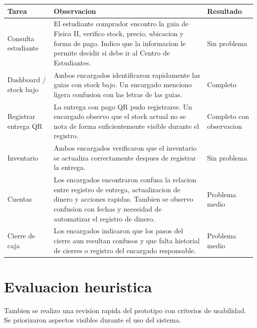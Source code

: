 \documentclass[12pt,letterpaper]{article}
\begin{document}
\begin{center}
\begin{tabularx}{\textwidth}{|B{3.6cm}|Y|B{2.6cm}|}
\hline
Tarea & Observacion & Resultado \\
\hline
Consulta estudiante & El estudiante comprador encontro la guia de Fisica II, verifico stock, precio, ubicacion y forma de pago. Indico que la informacion le permite decidir si debe ir al Centro de Estudiantes. & Sin problema \\
\hline
Dashboard / stock bajo & Ambos encargados identificaron rapidamente las guias con stock bajo. Un encargado menciono ligera confusion con las letras de las guias. & Completo \\
\hline
Registrar entrega QR & La entrega con pago QR pudo registrarse. Un encargado observo que el stock actual no se nota de forma suficientemente visible durante el registro. & Completo con observacion \\
\hline
Inventario & Ambos encargados verificaron que el inventario se actualiza correctamente despues de registrar la entrega. & Sin problema \\
\hline
Cuentas & Los encargados encontraron confusa la relacion entre registro de entrega, actualizacion de dinero y acciones rapidas. Tambien se observo confusion con fechas y necesidad de automatizar el registro de dinero. & Problema medio \\
\hline
Cierre de caja & Los encargados indicaron que los pasos del cierre aun resultan confusos y que falta historial de cierres o registro del encargado responsable. & Problema medio \\
\hline
\end{tabularx}
\end{center}

\section{Evaluacion heuristica}

Tambien se realizo una revision rapida del prototipo con criterios de usabilidad. Se priorizaron aspectos visibles durante el uso del sistema.
\end{document}
